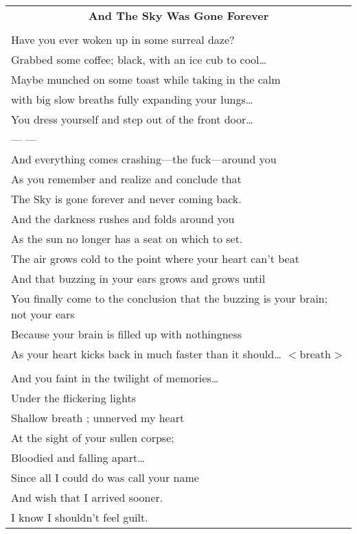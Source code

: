 \documentclass{article}
\begin{document}
\newcommand{\h}{\hspace*{4ex}}

\begin{center}
\begin{tabular}{l}
\multicolumn{1}{c}{\large\textbf{And The Sky Was Gone Forever}} \\
\\
Have you ever woken up in some surreal daze? \\
Grabbed some coffee; black, with an ice cub to cool\ldots{} \\
Maybe munched on some toast while taking in the calm \\
with big slow breaths fully expanding your lungs\ldots{} \\
You dress yourself and step out of the front door\ldots{} \\
--- ---\\
And everything comes crashing---the fuck---around you \\
As you remember and realize and conclude that \\
The Sky is gone forever and never coming back. \\
And the darkness rushes and folds around you \\
As the sun no longer has a seat on which to set. \\
The air grows cold to the point where your heart can't beat \\
And that buzzing in your ears grows and grows until \\
You finally come to the conclusion that the buzzing is your brain; not your ears \\
Because your brain is filled up with nothingness \\
As your heart kicks back in much faster than it should\ldots{} $<\text{breath}>$ \\
\\
\h{}And you faint in the twilight of memories\ldots{} \\
\h{}Under the flickering lights \\
\h{}Shallow breath ; unnerved my heart \\
\h{}At the sight of your sullen corpse; \\
\h{}Bloodied and falling apart\ldots{} \\
\h{}Since all I could do was call your name \\
\h{}And wish that I arrived sooner. \\
\h{}I know I shouldn't feel guilt. \\

\end{tabular}
\end{center}
\end{document}
